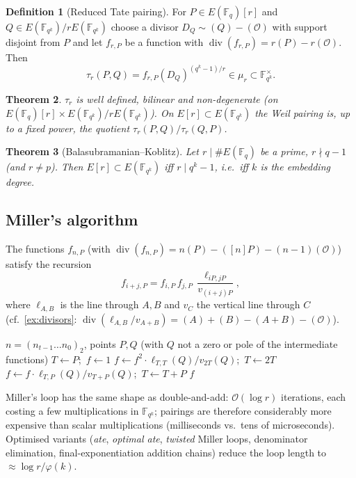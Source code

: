 \documentclass[11pt,a4paper,oneside]{book}
\theoremstyle{plain}
\newtheorem{theorem}{Theorem}[chapter]
\theoremstyle{definition}
\newtheorem{definition}[theorem]{Definition}
\theoremstyle{remark}
\newcommand{\F}{\mathbb{F}}
\newcommand{\Fq}{\mathbb{F}_q}
\newcommand{\Oinf}{\mathcal{O}}
\newcommand{\divv}{\operatorname{div}}
\newcommand{\bigO}{\mathcal{O}}
\begin{document}
\begin{definition}[Reduced Tate pairing]
For $P\in E(\Fq)[r]$ and $Q\in E(\F_{q^k})/rE(\F_{q^k})$ choose a divisor $D_Q\sim(Q)-(\Oinf)$ with support disjoint from $P$ and let $f_{r,P}$ be a function with $\divv(f_{r,P})=r(P)-r(\Oinf)$. Then
\[
\tau_r(P,Q)=f_{r,P}(D_Q)^{(q^k-1)/r}\in\mu_r\subset\F_{q^k}^\times .
\]
\end{definition}

\begin{theorem}
$\tau_r$ is well defined, bilinear and non-degenerate (on $E(\Fq)[r]\times E(\F_{q^k})/rE(\F_{q^k})$). On $E[r]\subset E(\F_{q^k})$ the Weil pairing is, up to a fixed power, the quotient $\tau_r(P,Q)/\tau_r(Q,P)$.
\end{theorem}

\begin{theorem}[Balasubramanian--Koblitz]\label{thm:BK}
Let $r\mid\#E(\Fq)$ be a prime, $r\nmid q-1$ (and $r\ne p$). Then $E[r]\subset E(\F_{q^k})$ iff $r\mid q^k-1$, i.e.\ iff $k$ is the embedding degree.
\end{theorem}

\subsection{Miller's algorithm}

The functions $f_{n,P}$ (with $\divv(f_{n,P})=n(P)-([n]P)-(n-1)(\Oinf)$) satisfy the recursion
\[
f_{i+j,P}=f_{i,P}\,f_{j,P}\,\frac{\ell_{iP,jP}}{v_{(i+j)P}},
\]
where $\ell_{A,B}$ is the line through $A,B$ and $v_C$ the vertical line through $C$ (cf.\ \cref{ex:divisors}: $\divv(\ell_{A,B}/v_{A+B})=(A)+(B)-(A+B)-(\Oinf)$).

\begin{algorithm}[ht]
\caption{Miller's algorithm: evaluate $f_{n,P}(Q)$}\label{alg:miller}
\begin{algorithmic}[1]
\Require $n=(n_{t-1}\dots n_0)_2$, points $P,Q$ (with $Q$ not a zero or pole of the intermediate functions)
\State $T\gets P$;\ $f\gets1$
  \State $f\gets f^2\cdot\ell_{T,T}(Q)/v_{2T}(Q)$;\ $T\gets2T$
  \ $f\gets f\cdot\ell_{T,P}(Q)/v_{T+P}(Q)$;\ $T\gets T+P$\EndIf
\EndFor
\State \Return $f$ 
\end{algorithmic}
\end{algorithm}

Miller's loop has the same shape as double-and-add: $\bigO(\log r)$ iterations, each costing a few multiplications in $\F_{q^k}$; pairings are therefore considerably more expensive than scalar multiplications (milliseconds vs.\ tens of microseconds). Optimised variants (\emph{ate}, \emph{optimal ate}, \emph{twisted} Miller loops, denominator elimination, final-exponentiation addition chains) reduce the loop length to $\approx\log r/\varphi(k)$.
\end{document}
